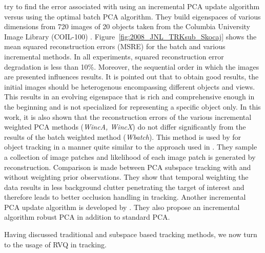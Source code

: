 \begin{Body}
\cite{2008_JNL_TRKsubs_Skocaj} try to find the error associated with using an incremental PCA update algorithm versus using the optimal batch PCA algorithm.  They build eigenspaces of various dimensions from 720 images of 20 objects taken from the Columbia University Image Library (COIL-100)  \cite{Web_COIL}.  Figure~\ref{fig:2008_JNL_TRKsub_Skocaj} shows the mean squared reconstruction errors (MSRE) for the batch and various incremental methods.  In all experiments, squared reconstruction error degradation is less than 10\%.  Moreover, the sequential order in which the images are presented influences results.  It is pointed out that to obtain good results, the initial images should be heterogenous encompassing different objects and views.  This results in an evolving eigenspace that is rich and comprehensive enough in the beginning and is not specialized for representing a specific object only.  In this work, it is also shown that the reconstruction errors of the various incremental weighted PCA methods (\emph{WincA, WincX}) do not differ significantly from the results of the batch weighted method (\emph{Wbatch}).  This method is used by \cite{2010_CNF_TRKsubs_Qian} for object tracking in a manner quite similar to the approach used in \cite{2008_JNL_subspaceTRK_Ross}.  They sample a collection of image patches and likelihood of each image patch is generated by reconstruction.  Comparison is made between PCA subspace tracking with and without weighting prior observations.  They show that temporal weighting the data results in less background clutter penetrating the target of interest and therefore leads to better occlusion handling in tracking.  Another incremental PCA update algorithm is developed by \cite{2004_JNL_TRKsubs_Li}.  They also propose an incremental algorithm robust PCA in addition to standard PCA.

Having discussed traditional and subspace based tracking methods, we now turn to the usage of RVQ in tracking.



\end{Body}
\begin{EndMatter}
\end{EndMatter}

